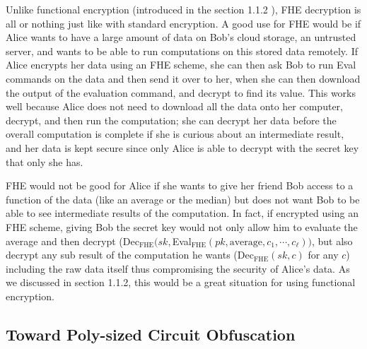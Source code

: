\documentclass[12pt,twoside]{reedthesis}
\begin{document}
    \par Unlike functional encryption (introduced in the section 1.1.2 ), FHE decryption is all or nothing just like with standard encryption. A good use for FHE would be if Alice wants to have a large amount of data on Bob's cloud storage, an untrusted server, and wants to be able to run computations on this stored data remotely. If Alice encrypts her data using an FHE scheme, she can then ask Bob to run Eval commands on the data and then send it over to her, when she can then download the output of the evaluation command, and decrypt to find its value. This works well because Alice does not need to download all the data onto her computer, decrypt, and then run the computation; she can decrypt her data before the overall computation is complete if she is curious about an intermediate result, and her data is kept secure since only Alice is able to decrypt with the secret key that only she has.
    \par FHE would not be good for Alice if she wants to give her friend Bob access to a function of the data (like an average or the median) but does not want Bob to be able to see intermediate results of the computation. In fact, if encrypted using an FHE scheme, giving Bob the secret key would not only allow him to evaluate the average and then decrypt (Dec$_\text{FHE}(sk,$Eval$_\text{FHE}(pk,\text{average},c_1,\cdots,c_\ell))$, but also decrypt any sub result of the computation he wants (Dec$_\text{FHE}(sk,c)$ for any $c$) including the raw data itself thus compromising the security of Alice's data. As we discussed in section 1.1.2, this would be a great situation for using functional encryption.
    
    
    \subsection{Toward Poly-sized Circuit Obfuscation}
    
    \newcommand{\ionc}[0]{i\mathcal{O}_\text{NC}}
     \newcommand{\fhe}[0]{_\text{FHE}}
\end{document}
